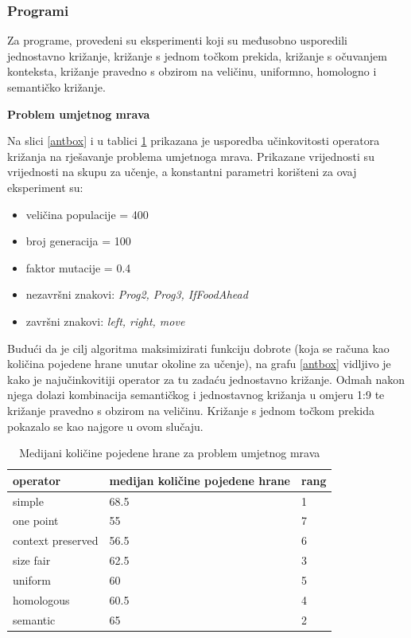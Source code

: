 \subsubsection{Programi}

Za programe, provedeni su eksperimenti koji su međusobno usporedili jednostavno križanje, križanje s jednom točkom prekida, križanje s očuvanjem konteksta, križanje pravedno s obzirom na veličinu, uniformno, homologno i semantičko križanje.

\textbf{Problem umjetnog mrava}

Na slici \ref{antbox} i u tablici \ref{anttable} prikazana je usporedba učinkovitosti operatora križanja na rješavanje problema umjetnoga mrava. Prikazane vrijednosti su vrijednosti na skupu za učenje, a konstantni parametri korišteni za ovaj eksperiment su:
\begin{itemize}
\item{veličina populacije = 400}
\item{broj generacija = 100}
\item{faktor mutacije = 0.4}
\item{nezavršni znakovi: \textit{Prog2, Prog3, IfFoodAhead}}
\item{završni znakovi: \textit{left, right, move}}
\end{itemize} 

Budući da je cilj algoritma maksimizirati funkciju dobrote (koja se računa kao količina pojedene hrane unutar okoline za učenje), na grafu \ref{antbox} vidljivo je kako je najučinkovitiji operator za tu zadaću jednostavno križanje. Odmah nakon njega dolazi kombinacija semantičkog i jednostavnog križanja u omjeru 1:9 te križanje pravedno s obzirom na veličinu. Križanje s jednom točkom prekida pokazalo se kao najgore u ovom slučaju.

\begin{table}[H]
 	\centering
    \caption{Medijani količine pojedene hrane za problem umjetnog mrava}
    \begin{tabular}{| l | l | l |}
    \hline
    \textbf{operator} & \textbf{medijan količine pojedene hrane} & \textbf{rang}\\ \hline
    simple & 68.5 & 1\\ \hline
    one point & 55 & 7\\ \hline
    context preserved & 56.5 & 6\\ \hline
    size fair & 62.5 & 3\\ \hline
    uniform & 60 & 5\\ \hline
    homologous & 60.5 & 4\\ \hline
    semantic & 65 & 2\\ \hline
    \end{tabular}
    

    \label{anttable}
\end{table}

